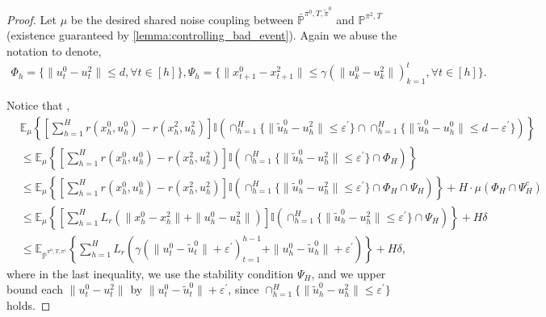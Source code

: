 \documentclass{article}
\begin{document}
\begin{proof}
 Let $\mu$ be the desired shared noise coupling between $\bar {\mathbb P}^{\pi^0, T, \tilde \pi^0}$ and $\mathbb P^{\pi^2, T}$ (existence guaranteed by \cref{lemma:controlling_bad_event}). Again we abuse the notation to denote,
\begin{align*}
    \Phi_h = \{\|u_t^0-u_t^2\|\leq d, \forall t\in[h]\}, \Psi_h = \{\|x_{t+1}^0-x_{t+1}^2\|\leq \gamma(\|u^0_k-u^2_k\|)_{k=1}^t,\forall t\in[h]\}.
\end{align*}
 
 Notice that ,
\begin{align*}
    &\mathbb E_\mu\left\{[\sum_{h=1}^H r(x_h^0, u_h^0)-r(x_h^2, u_h^2)]\mathbb I\left( \mathop{\cap}_{h=1}^H \{\|\tilde u_h^0-u_h^2\|\leq \varepsilon^\prime\} \cap \mathop{\cap}_{h=1}^H \{\|\tilde u_h^0-u_h^0\|\leq d-\varepsilon^\prime\}\right)\right\}\\
    &\leq \mathbb E_\mu\left\{[\sum_{h=1}^H r(x_h^0, u_h^0)-r(x_h^2, u_h^2)]\mathbb I\left( \mathop{\cap}_{h=1}^H \{\|\tilde u_h^0-u_h^2\|\leq \varepsilon^\prime\} \cap \Phi_H\right)\right\}\\
    &\leq \mathbb E_\mu\left\{[\sum_{h=1}^H r(x_h^0, u_h^0)-r(x_h^2, u_h^2)]\mathbb I\left( \mathop{\cap}_{h=1}^H \{\|\tilde u_h^0-u_h^2\|\leq \varepsilon^\prime\} \cap \Phi_H\cap \Psi_H\right)\right\} + H \cdot \mu(\Phi_H\cap \Psi_H^c)\\
    &\leq \mathbb E_\mu\left\{[\sum_{h=1}^H L_r(\|x_h^0-x_h^2\|+\|u_h^0-u_h^2\|)]\mathbb I\left( \mathop{\cap}_{h=1}^H \{\|\tilde u_h^0-u_h^2\|\leq \varepsilon^\prime \}\cap \Psi_H\right)\right\}+H\delta\\
    &\leq \mathbb E_{\bar {\mathbb P}^{\pi^0, T, \pi^1}}\left\{\sum_{h=1}^HL_r(\gamma( \|u_t^0-\tilde u_t^0\|+\varepsilon^\prime)_{t=1}^{h-1}+\|u_h^0-\tilde u_h^0\|+\varepsilon^\prime)\right\} + H\delta,
\end{align*}
where in the last inequality, we use the stability condition $\Psi_H$, and we upper bound each $\|u_t^0-u_t^2\|$ by $\|u_t^0-\tilde u_t^0\|+\varepsilon^\prime$, since $\mathop{\cap}_{h=1}^H\{\|\tilde u_h^0-u_h^2\|\leq \varepsilon^\prime\}$ holds.


\end{proof}
\end{document}
